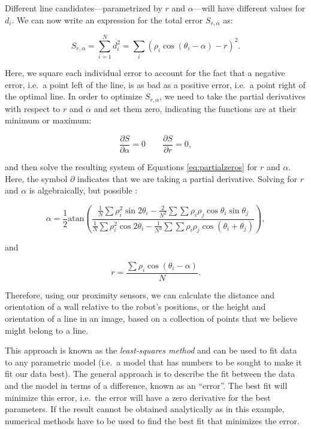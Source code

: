 Different line candidates---parametrized by $ r$ and $ \alpha$---will have different values for $ d_i$. We can now write an expression for the total error $ S_{r,\alpha}$ as:

\begin{equation}
S_{r,\alpha}=\sum_{i=1}^{N}{d_i^2}=\sum_i(\rho_i \cos(\theta_i-\alpha)-r)^2.
\end{equation}

Here, we square each individual error to account for the fact that a negative error, i.e.\ a point left of the line, is as bad as a positive error, i.e.\ a point right of the optimal line. In order to optimize $ S_{r,\alpha}$, we need to take the partial derivatives with respect to $ r$ and $ \alpha$ and set them zero, indicating the functions are at their minimum or maximum:

\begin{equation}
\frac{\partial{S}}{\partial{\alpha}}=0 \qquad \frac{\partial{S}}{\partial{r}}=0,
\label{eq:partialzeros}
\end{equation}

\noindent and then solve the resulting system of Equations \eqref{eq:partialzeros} for $ r$ and $ \alpha$. Here, the symbol $ \partial$ indicates that we are taking a partial derivative. Solving for $r$ and $\alpha$ is algebraically, but possible \cite{siegwart2011introduction}:

\begin{equation}\label{eq:linealpha}
\alpha=\frac{1}{2}\text{atan}\left(\frac{\frac{1}{N}\sum{\rho_i^2 \sin 2\theta_i}-\frac{2}{N^2}\sum{\sum{\rho_i\rho_j \cos \theta_i \sin \theta_j}}}{\frac{1}{N}\sum{\rho_i^2 \cos 2 \theta_i - \frac{1}{N^2}\sum{\sum{\rho_i \rho_j \cos(\theta_i+\theta_j)}}}}\right),
\end{equation}

\noindent and

\begin{equation}\label{eq:liner}
r=\frac{{\sum \rho_i \cos (\theta_i-\alpha)}}{N}.
\end{equation}

Therefore, using our proximity sensors, we can calculate the distance and orientation of a wall relative to the robot's positions, or the height and orientation of a line in an image, based on a collection of points that we believe might belong to a line.

This approach is known as the \textsl{least-squares method} and can be used to fit data to any parametric model (i.e.\ a model that has numbers to be sought to make it fit our data best). The general approach is to describe the fit between the data and the model in terms of a difference, known as an ``error''. The best fit will minimize this error, i.e.\ the error will have a zero derivative for the best parameters. If the result cannot be obtained analytically as in this example, numerical methods have to be used to find the best fit that minimizes the error.

